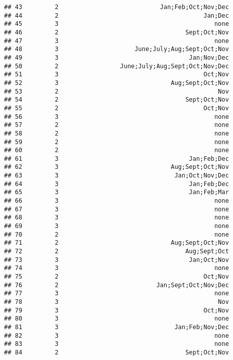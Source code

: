 \documentclass[
]{article}
\begin{document}
\begin{verbatim}
## 43         2                            Jan;Feb;Oct;Nov;Dec
## 44         2                                        Jan;Dec
## 45         3                                           none
## 46         2                                   Sept;Oct;Nov
## 47         3                                           none
## 48         3                     June;July;Aug;Sept;Oct;Nov
## 49         3                                    Jan;Nov;Dec
## 50         2                 June;July;Aug;Sept;Oct;Nov;Dec
## 51         3                                        Oct;Nov
## 52         3                               Aug;Sept;Oct;Nov
## 53         2                                            Nov
## 54         2                                   Sept;Oct;Nov
## 55         2                                        Oct;Nov
## 56         3                                           none
## 57         2                                           none
## 58         2                                           none
## 59         2                                           none
## 60         2                                           none
## 61         3                                    Jan;Feb;Dec
## 62         3                               Aug;Sept;Oct;Nov
## 63         3                                Jan;Oct;Nov;Dec
## 64         3                                    Jan;Feb;Dec
## 65         3                                    Jan;Feb;Mar
## 66         3                                           none
## 67         3                                           none
## 68         3                                           none
## 69         3                                           none
## 70         2                                           none
## 71         2                               Aug;Sept;Oct;Nov
## 72         2                                   Aug;Sept;Oct
## 73         3                                    Jan;Oct;Nov
## 74         3                                           none
## 75         2                                        Oct;Nov
## 76         2                           Jan;Sept;Oct;Nov;Dec
## 77         3                                           none
## 78         3                                            Nov
## 79         3                                        Oct;Nov
## 80         3                                           none
## 81         3                                Jan;Feb;Nov;Dec
## 82         3                                           none
## 83         3                                           none
## 84         2                                   Sept;Oct;Nov

\end{verbatim}
\end{document}
